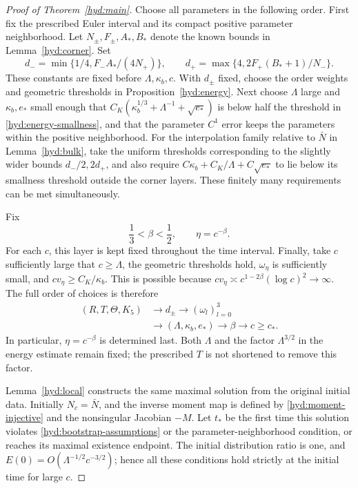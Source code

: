 \begin{proof}[Proof of Theorem~\ref{hyd:main}]
 Choose all parameters in the following order. First fix the prescribed
 Euler interval and its compact positive parameter neighborhood. Let
 $N_\pm,F_\pm,A_*,B_*$ denote the known bounds in
 Lemma~\ref{hyd:corner}. Set
 \begin{equation}\label{hyd:ratio-choice}
 d_- =\min\{1/4,F_-A_*/(4N_+)\},\qquad
 d_+ =\max\{4,2F_+(B_*+1)/N_-\}.
 \end{equation}
 These constants are fixed before $\Lambda,\kappa_b,c$. With $d_\pm$
 fixed, choose the order weights and geometric thresholds in
 Proposition~\ref{hyd:energy}. Next choose $\Lambda$ large and
 $\kappa_b,e_*$ small enough that
 $C_K(\kappa_b^{1/3}+\Lambda^{-1}+\sqrt{e_*})$ is below half the
 threshold in \eqref{hyd:energy-smallness}, and that the parameter
 $C^1$ error keeps the parameters within the positive neighborhood.
 For the interpolation family relative to $\bar N$ in
 Lemma~\ref{hyd:bulk}, take the uniform thresholds corresponding to
 the slightly wider bounds $d_-/2,2d_+$, and also require
 $C\kappa_b+C_K/\Lambda+C\sqrt{e_*}$ to lie below its smallness
 threshold outside the corner layers. These finitely many requirements
 can be met simultaneously.

 Fix
 \begin{equation}\label{hyd:eta-choice}
 \frac13<\beta<\frac12,\qquad \eta=c^{-\beta}.
 \end{equation}
 For each $c$, this layer is kept fixed throughout the time interval.
 Finally, take $c$ sufficiently large that $c\ge\Lambda$, the geometric
 thresholds hold, $\omega_\eta$ is sufficiently small, and
 $cv_\eta\ge C_K/\kappa_b$. This is possible because
 $cv_\eta\asymp c^{1-2\beta}(\log c)^2\to\infty$.
 The full order of choices is therefore
 \[
 \begin{aligned}
 (R,T,\Theta,K_5)&\longrightarrow d_\pm
              \longrightarrow(\omega_l)_{l=0}^3\\
 &\longrightarrow(\Lambda,\kappa_b,e_*)
              \longrightarrow\beta\longrightarrow c\ge c_*.
 \end{aligned}
 \]
 In particular, $\eta=c^{-\beta}$ is determined last. Both $\Lambda$
 and the factor $\Lambda^{3/2}$ in the energy estimate remain fixed;
 the prescribed $T$ is not shortened to remove this factor.

 Lemma~\ref{hyd:local} constructs the same maximal solution from the
 original initial data. Initially $N_c=\bar N$, and the inverse moment
 map is defined by \eqref{hyd:moment-injective} and the nonsingular
 Jacobian $-M$. Let $t_*$ be the first time this solution violates
 \eqref{hyd:bootstrap-assumptions} or the parameter-neighborhood
 condition, or reaches its maximal existence endpoint. The initial
 distribution ratio is one, and
 $E(0)=O(\Lambda^{-1/2}c^{-3/2})$; hence all these conditions hold
 strictly at the initial time for large $c$.


\end{proof}

